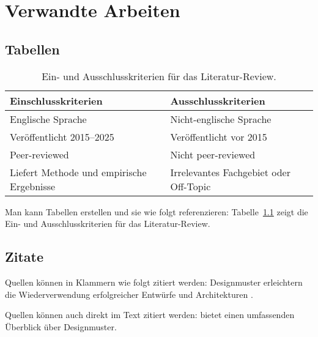\chapter{Verwandte Arbeiten}
\label{chap:related-work}

\section{Tabellen}

\begin{table}[htbp]
    \centering
    \caption{Ein- und Ausschlusskriterien für das Literatur-Review.}
    \label{table:review-criteria}
    \begin{tabularx}{1.0\textwidth}{>{\raggedright\arraybackslash}X>{\raggedright\arraybackslash}X}
        \toprule
        \textbf{Einschlusskriterien}                & \textbf{Ausschlusskriterien}              \\
        \midrule
        Englische Sprache                           & Nicht-englische Sprache                   \\
        Veröffentlicht 2015–2025                    & Veröffentlicht vor 2015                   \\
        Peer-reviewed                               & Nicht peer-reviewed                       \\
        Liefert Methode und empirische Ergebnisse   & Irrelevantes Fachgebiet oder Off-Topic    \\
        \bottomrule
    \end{tabularx}
\end{table}

Man kann Tabellen erstellen und sie wie folgt referenzieren: Tabelle~\ref{table:review-criteria} zeigt die Ein- und Ausschlusskriterien für das Literatur-Review.

\section{Zitate}

Quellen können in Klammern wie folgt zitiert werden: Designmuster erleichtern die Wiederverwendung erfolgreicher Entwürfe und Architekturen \autocite{gamma1994design}.

Quellen können auch direkt im Text zitiert werden: \textcite{gamma1994design} bietet einen umfassenden Überblick über Designmuster.
